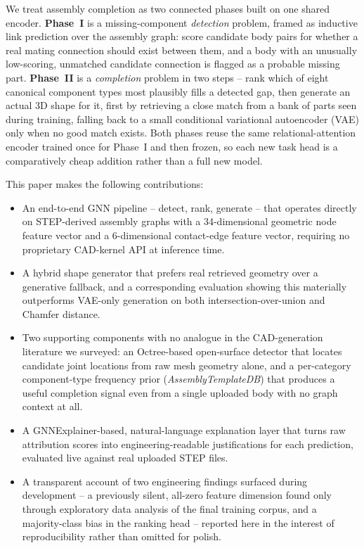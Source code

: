 \documentclass[sn-mathphys,Numbered]{sn-jnl}
\begin{document}
We treat assembly completion as two connected phases built on one shared encoder. \textbf{Phase~I} is a missing-component \emph{detection} problem, framed as inductive link prediction over the assembly graph: score candidate body pairs for whether a real mating connection should exist between them, and a body with an unusually low-scoring, unmatched candidate connection is flagged as a probable missing part. \textbf{Phase~II} is a \emph{completion} problem in two steps -- rank which of eight canonical component types most plausibly fills a detected gap, then generate an actual 3D shape for it, first by retrieving a close match from a bank of parts seen during training, falling back to a small conditional variational autoencoder (VAE) only when no good match exists. Both phases reuse the same relational-attention encoder trained once for Phase~I and then frozen, so each new task head is a comparatively cheap addition rather than a full new model.

This paper makes the following contributions:
\begin{itemize}
\item An end-to-end GNN pipeline -- detect, rank, generate -- that operates directly on STEP-derived assembly graphs with a 34-dimensional geometric node feature vector and a 6-dimensional contact-edge feature vector, requiring no proprietary CAD-kernel API at inference time.
\item A hybrid shape generator that prefers real retrieved geometry over a generative fallback, and a corresponding evaluation showing this materially outperforms VAE-only generation on both intersection-over-union and Chamfer distance.
\item Two supporting components with no analogue in the CAD-generation literature we surveyed: an Octree-based open-surface detector that locates candidate joint locations from raw mesh geometry alone, and a per-category component-type frequency prior (\textit{AssemblyTemplateDB}) that produces a useful completion signal even from a single uploaded body with no graph context at all.
\item A GNNExplainer-based, natural-language explanation layer that turns raw attribution scores into engineering-readable justifications for each prediction, evaluated live against real uploaded STEP files.
\item A transparent account of two engineering findings surfaced during development -- a previously silent, all-zero feature dimension found only through exploratory data analysis of the final training corpus, and a majority-class bias in the ranking head -- reported here in the interest of reproducibility rather than omitted for polish.
\end{itemize}
\end{document}
